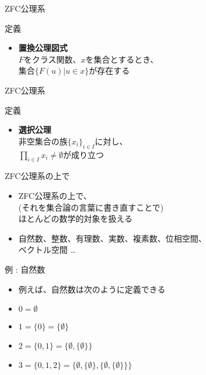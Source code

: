 \documentclass[17pt,aspectratio=169]{beamer}
\begin{document}
\begin{frame}{ZFC公理系}
    \begin{block}{定義}
        \begin{itemize}
            \item \textbf{置換公理図式} \\
                  $F$をクラス関数、$x$を集合とするとき、\\
                  集合$\{ F(u) | u \in x \}$が存在する
        \end{itemize}
    \end{block}
\end{frame}


\begin{frame}{ZFC公理系}
    \begin{block} {定義}
        \begin{itemize}
            \item \textbf{選択公理} \\
                  非空集合の族$\{x_i\}_{i \in I}$に対し、\\
                  $\prod_{i \in I} x_i \neq \emptyset$が成り立つ
        \end{itemize}
    \end{block}
\end{frame}


\begin{frame}{ZFC公理系の上で}
    \begin{itemize}

        \item ZFC公理系の上で、\\(それを集合論の言葉に書き直すことで)\\ ほとんどの数学的対象を扱える
        \item 自然数、整数、有理数、実数、複素数、位相空間、\\ ベクトル空間 \dots

    \end{itemize}
\end{frame}

\begin{frame}{例 : 自然数}
    \begin{itemize}
        \item 例えば、自然数は次のように定義できる
        \item $0 = \emptyset$
        \item $1 = \{0\} = \{\emptyset\}$
        \item $2 = \{0, 1\} = \{\emptyset, \{\emptyset\}\}$
        \item $3 = \{0, 1, 2\} = \{\emptyset, \{\emptyset\}, \{\emptyset, \{\emptyset\}\}\}$
    \end{itemize}
\end{frame}
\end{document}
